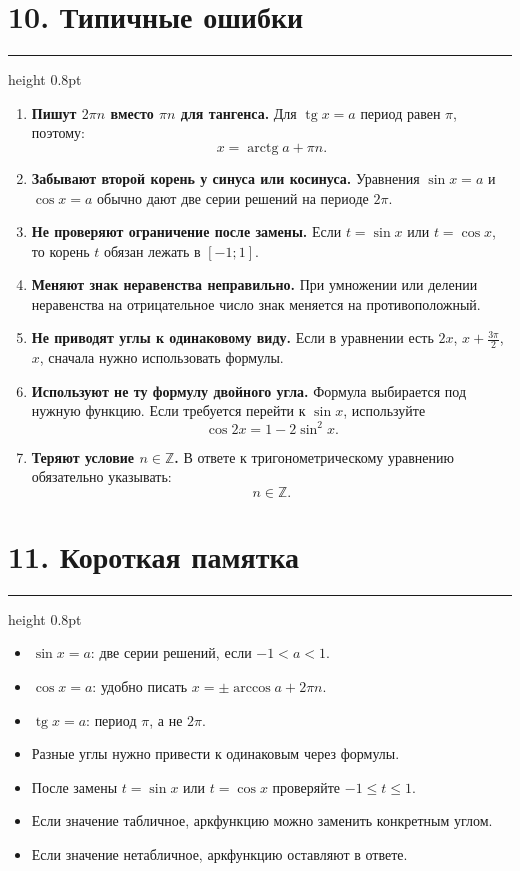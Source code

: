 \documentclass[a4paper,12pt]{article}
\newcommand{\sectionline}{\vspace{0.2em}\textcolor{accent}{\hrule height 0.8pt}\vspace{0.7em}}
\newcommand{\important}[1]{\textcolor{darkaccent}{\textbf{#1}}}
\newcommand{\Z}{\mathbb{Z}}
\newcommand{\tg}{\mathop{\mathrm{tg}}\nolimits}
\newcommand{\arctg}{\mathop{\mathrm{arctg}}\nolimits}
\begin{document}
\section*{10. Типичные ошибки}
\sectionline

\begin{enumerate}
    \item \important{Пишут \(2\pi n\) вместо \(\pi n\) для тангенса.}  
    Для \(\tg x=a\) период равен \(\pi\), поэтому:
    \[
    x=\arctg a+\pi n.
    \]

    \item \important{Забывают второй корень у синуса или косинуса.}  
    Уравнения \(\sin x=a\) и \(\cos x=a\) обычно дают две серии решений на периоде \(2\pi\).

    \item \important{Не проверяют ограничение после замены.}  
    Если \(t=\sin x\) или \(t=\cos x\), то корень \(t\) обязан лежать в \([-1;1]\).

    \item \important{Меняют знак неравенства неправильно.}  
    При умножении или делении неравенства на отрицательное число знак меняется на противоположный.

    \item \important{Не приводят углы к одинаковому виду.}  
    Если в уравнении есть \(2x\), \(x+\frac{3\pi}{2}\), \(x\), сначала нужно использовать формулы.

    \item \important{Используют не ту формулу двойного угла.}  
    Формула выбирается под нужную функцию. Если требуется перейти к \(\sin x\), используйте
    \[
    \cos2x=1-2\sin^2x.
    \]

    \item \important{Теряют условие \(n\in\Z\).}  
    В ответе к тригонометрическому уравнению обязательно указывать:
    \[
    n\in\Z.
    \]
\end{enumerate}

\section*{11. Короткая памятка}
\sectionline

\begin{itemize}
    \item \(\sin x=a\): две серии решений, если \(-1<a<1\).
    \item \(\cos x=a\): удобно писать \(x=\pm\arccos a+2\pi n\).
    \item \(\tg x=a\): период \(\pi\), а не \(2\pi\).
    \item Разные углы нужно привести к одинаковым через формулы.
    \item После замены \(t=\sin x\) или \(t=\cos x\) проверяйте \(-1\le t\le1\).
    \item Если значение табличное, аркфункцию можно заменить конкретным углом.
    \item Если значение нетабличное, аркфункцию оставляют в ответе.
\end{itemize}
\end{document}
